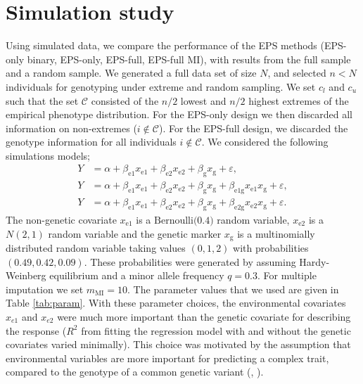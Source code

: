 \documentclass[10pt,a4paper]{article}
\begin{document}
\section{Simulation study}
Using simulated data, we compare the performance of the EPS methods (EPS-only binary, EPS-only, EPS-full, EPS-full MI), with results from the full sample and a random sample. We generated a full data set of size $N$, and selected $n<N$ individuals for genotyping under extreme and random sampling. We set $c_l$ and $c_u$ such that the set $\mathcal{C}$ consisted of the $n/2$ lowest and $n/2$ highest extremes of the empirical phenotype distribution. For the EPS-only design we then discarded all information on non-extremes ($i \not\in \mathcal{C}$). For the EPS-full design, we discarded the genotype information for all individuals $i \not \in \mathcal{C}$. We considered the following simulations models;
\begin{align}
Y & = \alpha + \beta_{\text{e}1} x_{\text{e}1} + \beta_{\text{e}2} x_{\text{e}2} + \beta_{\text{g}} x_{\text{g}} + \varepsilon, \label{eq:sim1} \\
Y & = \alpha + \beta_{\text{e}1} x_{\text{e}1} + \beta_{\text{e}2} x_{\text{e}2} + \beta_{\text{g}} x_{\text{g}}  + \beta_{\text{e}1\text{g}} x_{\text{e}1}x_{\text{g}} + \varepsilon, \label{eq:sim2} \\
Y & = \alpha + \beta_{\text{e}1} x_{\text{e}1} + \beta_{\text{e}2} x_{\text{e}2} + \beta_{\text{g}} x_{\text{g}}  + \beta_{\text{e}2\text{g}} x_{\text{e}2}x_{\text{g}} + \varepsilon \label{eq:sim3}. 
\end{align}
The non-genetic covariate $x_{\text{e}1}$ is a $\text{Bernoulli(0.4)}$ random variable, $x_{\text{e}2}$ is a $N(2,1)$ random variable and the genetic marker $x_\text{g}$ is a multinomially distributed random variable taking values $(0,1,2)$ with probabilities $(0.49,0.42,0.09)$. These probabilities were generated by assuming Hardy-Weinberg equilibrium and a minor allele frequency $q=0.3$. For multiple imputation we set $m_{\text{MI}}=10$. The parameter values that we used are given in Table \ref{tab:param}. With these parameter choices, the environmental covariates $x_{e1}$ and $x_{e2}$ were much more important than the genetic covariate for describing the response ($R^2$ from fitting the regression model with and without the genetic covariates varied minimally). This choice was motivated by the assumption that environmental variables are more important for predicting a complex trait, compared to the genotype of a common genetic variant (\cite{darvasi1992selective}, \cite{manolio2009finding}).
\end{document}
